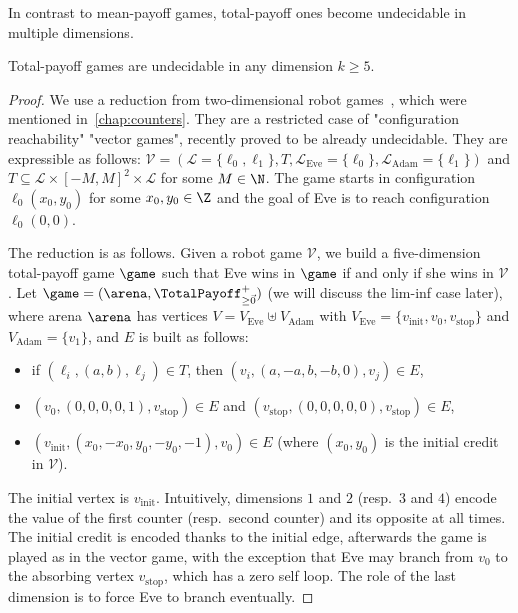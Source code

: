 In contrast to mean-payoff games, total-payoff ones become undecidable in multiple dimensions.

\begin{theorem}
\label{13-thm:TPundec}
Total-payoff games are undecidable in any dimension $k \geq 5$.
\end{theorem}

\begin{proof}
We use a reduction from two-dimensional robot games~\cite{Niskanen&Potapov&Reichert:2016}, which were mentioned in~\cref{chap:counters}. They are a restricted case of "configuration reachability" "vector games", recently proved to be already undecidable. They are expressible as follows: $\mathcal{V} = (\mathcal{L} = \{\ell_0, \ell_1\}, T, \mathcal{L}_{\text{Eve}} = \{\ell_0\}, \mathcal{L}_{\text{Adam}} = \{\ell_1\})$ and $T \subseteq \mathcal{L} \times [-M, M]^2\times \mathcal{L}$ for some $M \in \N$. The game starts in configuration $\ell_0(x_0, y_0)$ for some $x_0, y_0 \in \Z$ and the goal of Eve is to reach configuration $\ell_0(0, 0)$.

The reduction is as follows. Given a robot game $\mathcal{V}$, we build a five-dimension total-payoff game $\game$ such that Eve wins in $\game$ if and only if she wins in $\mathcal{V}$. Let $\game = (\arena, \TotalPayoff^{+}_{\geq \vec{0}})$ (we will discuss the lim-inf case later), where arena $\arena$ has vertices $V = V_{\text{Eve}} \uplus V_{\text{Adam}}$ with $V_{\text{Eve}} = \{v_{\text{init}}, v_0, v_{\text{stop}}\}$ and $V_{\text{Adam}} = \{v_1\}$, and $E$ is built as follows:
\begin{itemize}
\item if $(\ell_i, (a,b), \ell_j) \in T$, then $(v_i, (a, -a, b, -b, 0), v_j) \in E$,
\item $(v_0, (0, 0, 0, 0, 1), v_{\text{stop}}) \in E$ and $(v_{\text{stop}}, (0, 0, 0, 0, 0), v_{\text{stop}}) \in E$,
\item $(v_{\text{init}}, (x_0, -x_0, y_0, -y_0, -1), v_0) \in E$ (where $(x_0, y_0)$ is the initial credit in $\mathcal{V}$).
\end{itemize}
The initial vertex is $v_{\text{init}}$. Intuitively, dimensions $1$ and $2$ (resp.~$3$ and $4$) encode the value of the first counter (resp.~second counter) and its opposite at all times. The initial credit is encoded thanks to the initial edge, afterwards the game is played as in the vector game, with the exception that Eve may branch from $v_0$ to the absorbing vertex $v_{\text{stop}}$, which has a zero self loop. The role of the last dimension is to force Eve to branch eventually.


\end{proof}
